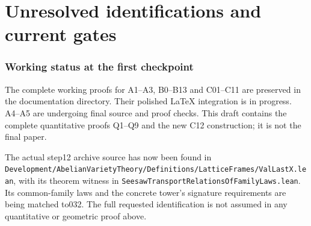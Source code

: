 \documentclass[11pt]{article}
\theoremstyle{definition}\newtheorem{definition}[theorem]{Definition}\newtheorem{remark}[theorem]{Remark}
\begin{document}
\part{Unresolved identifications and current gates}
\section{Working status at the first checkpoint}
The complete working proofs for A1--A3, B0--B13 and C01--C11 are preserved in the documentation directory. Their polished LaTeX integration is in progress. A4--A5 are undergoing final source and proof checks. This draft contains the complete quantitative proofs Q1--Q9 and the new C12 construction; it is not the final paper.

The actual step12 archive source has now been found in
\texttt{Development/AbelianVarietyTheory/Definitions/LatticeFrames/ValLastX.lean},
with its theorem witness in \texttt{SeesawTransportRelationsOfFamilyLaws.lean}.
Its common-family laws and the concrete tower's signature requirements are being matched to032. The full requested identification is not assumed in any quantitative or geometric proof above.
\end{document}
